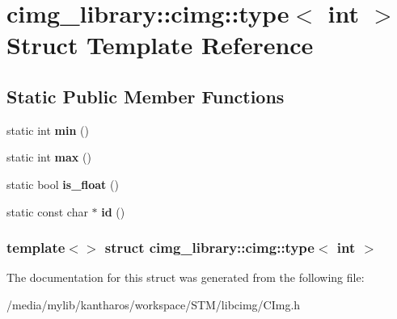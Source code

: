 \hypertarget{structcimg__library_1_1cimg_1_1type_3_01int_01_4}{
\section{cimg\_\-library::cimg::type$<$ int $>$ Struct Template Reference}
\label{structcimg__library_1_1cimg_1_1type_3_01int_01_4}
}
\subsection*{Static Public Member Functions}
\begin{DoxyCompactItemize}
\item 
\hypertarget{structcimg__library_1_1cimg_1_1type_3_01int_01_4_a2a75f3293c792a87cea5d04553475e23}{
static int {\bfseries min} ()}
\label{structcimg__library_1_1cimg_1_1type_3_01int_01_4_a2a75f3293c792a87cea5d04553475e23}

\item 
\hypertarget{structcimg__library_1_1cimg_1_1type_3_01int_01_4_a250a2545cef23bd0fa1ada241104dcc1}{
static int {\bfseries max} ()}
\label{structcimg__library_1_1cimg_1_1type_3_01int_01_4_a250a2545cef23bd0fa1ada241104dcc1}

\item 
\hypertarget{structcimg__library_1_1cimg_1_1type_3_01int_01_4_ade4be0635e62b7c295721f64fe7a6904}{
static bool {\bfseries is\_\-float} ()}
\label{structcimg__library_1_1cimg_1_1type_3_01int_01_4_ade4be0635e62b7c295721f64fe7a6904}

\item 
\hypertarget{structcimg__library_1_1cimg_1_1type_3_01int_01_4_a4fd16b0257cfcc62e8d61bfa567c9c9d}{
static const char $\ast$ {\bfseries id} ()}
\label{structcimg__library_1_1cimg_1_1type_3_01int_01_4_a4fd16b0257cfcc62e8d61bfa567c9c9d}

\end{DoxyCompactItemize}
\subsubsection*{template$<$$>$ struct cimg\_\-library::cimg::type$<$ int $>$}



The documentation for this struct was generated from the following file:\begin{DoxyCompactItemize}
\item 
/media/mylib/kantharos/workspace/STM/libcimg/CImg.h\end{DoxyCompactItemize}
